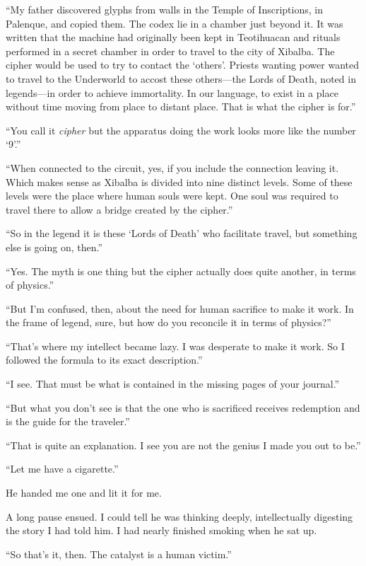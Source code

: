 ``My father discovered glyphs from walls in the Temple of Inscriptions,
in Palenque, and copied them. The codex lie in a chamber just beyond it.
It was written that the machine had originally been kept in Teotihuacan
and rituals performed in a secret chamber in order to travel to the city
of Xibalba. The cipher would be used to try to contact the `others'.
Priests wanting power wanted to travel to the Underworld to accost these
others---the Lords of Death, noted in legends---in order to achieve
immortality. In our language, to exist in a place without time moving
from place to distant place. That is what the cipher is for.''

``You call it \emph{cipher} but the apparatus doing the work looks more
like the number `9'.''

``When connected to the circuit, yes, if you include the connection
leaving it. Which makes sense as Xibalba is divided into nine distinct
levels. Some of these levels were the place where human souls were kept.
One soul was required to travel there to allow a bridge created by the
cipher.''

``So in the legend it is these `Lords of Death' who facilitate travel,
but something else is going on, then.''

``Yes. The myth is one thing but the cipher actually does quite another,
in terms of physics.''

``But I'm confused, then, about the need for human sacrifice to make it
work. In the frame of legend, sure, but how do you reconcile it in terms
of physics?''

``That's where my intellect became lazy. I was desperate to make it
work. So I followed the formula to its exact description.''

``I see. That must be what is contained in the missing pages of your
journal.''

``But what you don't see is that the one who is sacrificed receives
redemption and is the guide for the traveler.''

``That is quite an explanation. I see you are not the genius I made you
out to be.''

``Let me have a cigarette.''

He handed me one and lit it for me.

A long pause ensued. I could tell he was thinking deeply, intellectually
digesting the story I had told him. I had nearly finished smoking when
he sat up.

``So that's it, then. The catalyst is a human victim.''

